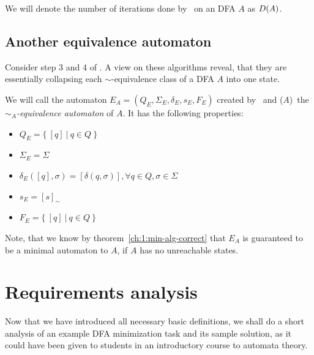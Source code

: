 We will denote the number of iterations done by \CompDist\ on an DFA $A$ as $D(A)$.

\subsection{Another equivalence automaton}

Consider step 3 and 4 of \MinAlg. A view on these algorithms reveal, that they are essentially collapsing each $\sim$-equivalence class of a DFA $A$ into one state.

\begin{definition} \label{ch:1:sim-eq-dfa}
    We will call the automaton $E_A = (Q_E, \Sigma_E, \delta_E, s_E, F_E)$ created by \CompDist\ and \RemEq($A$)\ the \emph{$\sim_A$-equivalence automaton} of $A$. It has the following properties:
    \begin{itemize}
        \item $Q_E = \{\ [q]\ |\ q \in Q\ \}$
        \item $\Sigma_E = \Sigma$
        \item $\delta_E([q], \sigma) = [\delta(q, \sigma)], \forall q \in Q, \sigma \in \Sigma$
        \item $s_E = [s]_\sim$
        \item $F_E = \{\ [q]\ |\ q \in Q\ \}$
    \end{itemize}
    Note, that we know by theorem~\ref{ch:1:min-alg-correct} that $E_A$ is guaranteed to be a minimal automaton to $A$, if $A$ has no unreachable states.
\end{definition}

%

\section{Requirements analysis}

Now that we have introduced all necessary basic definitions, we shall do a short analysis of an example DFA minimization task and its sample solution, as it could have been given to students in an introductory course to automata theory.

